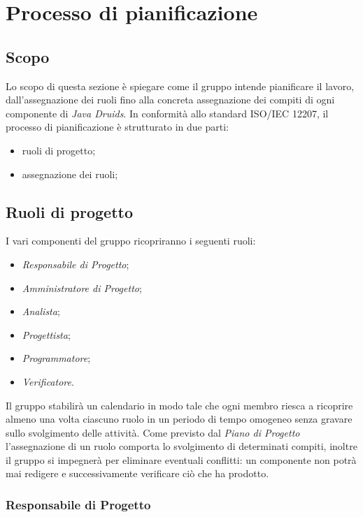 \section{Processo di pianificazione}\label{4.2}

\subsection{Scopo}\label{4.2.1}

Lo scopo di questa sezione è spiegare come il gruppo intende pianificare il lavoro, dall'assegnazione dei ruoli fino alla concreta assegnazione dei compiti di ogni componente di \textit{Java Druids}. In conformità allo standard ISO/IEC 12207, il processo di pianificazione è strutturato in due parti:
\begin{itemize}
	\item ruoli di progetto;
	\item assegnazione dei ruoli;
\end{itemize}

\subsection{Ruoli di progetto}\label{4.2.2}

I vari componenti del gruppo ricopriranno i seguenti ruoli:
\begin{itemize}
	\item \textit{Responsabile di Progetto};
	\item \textit{Amministratore di Progetto};
	\item \textit{Analista};
	\item \textit{Progettista};
	\item \textit{Programmatore};
	\item \textit{Verificatore}.
\end{itemize}

Il gruppo stabilirà un calendario in modo tale che ogni membro riesca a ricoprire almeno una volta ciascuno ruolo in un periodo di tempo omogeneo senza gravare sullo svolgimento delle attività. Come previsto dal \textit{Piano di Progetto} l'assegnazione di un ruolo comporta lo svolgimento di determinati compiti, inoltre il gruppo si impegnerà per eliminare eventuali conflitti: un componente non potrà mai redigere e successivamente verificare ciò che ha prodotto.

\subsubsection{Responsabile di Progetto}\label{4.2.2.1}

